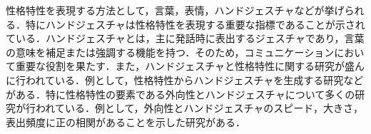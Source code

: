 性格特性を表現する方法として，言葉，表情，ハンドジェスチャなどが挙げられる．特にハンドジェスチャは性格特性を表現する重要な指標であることが示されている\cite{ハンドジェスチャ指標1}\cite{ハンドジェスチャ指標2}\cite{ハンドジェスチャ指標3}．ハンドジェスチャとは，主に発話時に表出するジェスチャであり，言葉の意味を補足または強調する機能を持つ\cite{ハンドジェスチャ強調}．そのため，コミュニケーションにおいて重要な役割を果たす．また，ハンドジェスチャと性格特性に関する研究が盛んに行われている．例として，性格特性からハンドジェスチャを生成する研究などがある\cite{ジェスチャ生成}．特に性格特性の要素である外向性とハンドジェスチャについて多くの研究が行われている．例として，外向性とハンドジェスチャのスピード，大きさ，表出頻度に正の相関があることを示した研究がある\cite{ジェスチャ生成}\cite{ハンドジェスチャ指標1}\cite{ハンドジェスチャ指標3}\cite{ハンドジェスチャ外向性}．












\vspace{1cm}
\begin{figure}[!h]
 \begin{center}
  \centering
  \label{fig:kansei}
 \end{center}
\end{figure}

